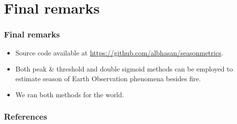\documentclass[aspectratio=169]{beamer}
\begin{document}
\section{Final remarks}

\begin{frame}
    \frametitle{Final remarks}
    \begin{itemize}
        \item Source code available at
                \url{https://github.com/albhasan/seasonmetrics}.
            \item Both peak \& threshold and double sigmoid methods can be
                employed to estimate season of Earth Observation phenomena 
                besides fire.
            \item We ran both methods for the world.
    \end{itemize}
\end{frame}

\begin{frame}[allowframebreaks]
    \frametitle{References}
    
    
\end{frame}
\end{document}
